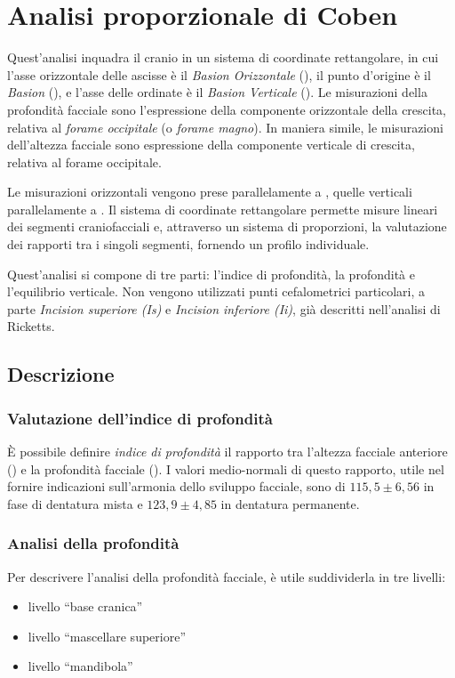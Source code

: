 \chapter{Analisi proporzionale di Coben}
\nocite{Coben1979,Manetti1984,Coben1985,Antonini1986}

Quest'analisi inquadra il cranio in un sistema di coordinate rettangolare, in cui l'asse orizzontale delle ascisse è il \textit{Basion Orizzontale} (), il punto d'origine è il \textit{Basion} (), e l'asse delle ordinate è il \textit{Basion Verticale} (). Le misurazioni della profondità facciale sono l'espressione della componente orizzontale della crescita, relativa al \textit{forame occipitale} (o \textit{forame magno}). In maniera simile, le misurazioni dell'altezza facciale sono espressione della componente verticale di crescita, relativa al forame occipitale.

Le misurazioni orizzontali vengono prese parallelamente a , quelle verticali parallelamente a . Il sistema di coordinate rettangolare permette misure lineari dei segmenti craniofacciali e, attraverso un sistema di proporzioni, la valutazione dei rapporti tra i singoli segmenti, fornendo un profilo individuale.

Quest'analisi si compone di tre parti: l'indice di profondità, la profondità e l'equilibrio verticale. Non vengono utilizzati punti cefalometrici particolari, a parte \textit{Incision superiore (Is)} e \textit{Incision inferiore (Ii)}, già descritti nell'analisi di Ricketts.

\section{Descrizione}
\subsection{Valutazione dell'indice di profondità}
È possibile definire \textit{indice di profondità} il rapporto tra l'altezza facciale anteriore () e la profondità facciale (). I valori medio-normali di questo rapporto, utile nel fornire indicazioni sull'armonia dello sviluppo facciale, sono di $115,5 \pm 6,56$ in fase di dentatura mista e $123,9 \pm 4,85$ in dentatura permanente.

\subsection{Analisi della profondità}
Per descrivere l'analisi della profondità facciale, è utile suddividerla in tre livelli:
\begin{itemize}
\item livello ``base cranica''
\item livello ``mascellare superiore''
\item livello ``mandibola''
\end{itemize}

